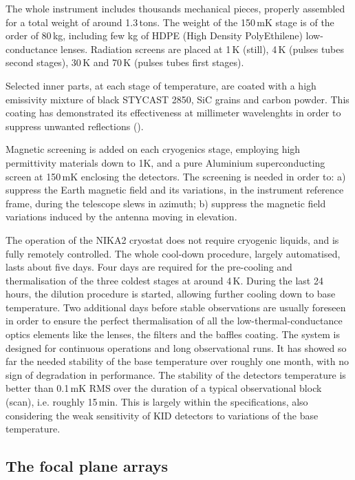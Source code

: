 \documentclass[]{aa} %
\begin{document}
The whole instrument includes thousands mechanical pieces, properly assembled for a total weight of around 1.3\,tons. The weight of the 150\,mK stage is of the order of 80\,kg, including few kg of HDPE (High Density PolyEthilene) low-conductance lenses. Radiation screens are placed at 1\,K (still), 4\,K (pulses tubes second stages), 30\,K and 70\,K (pulses tubes first stages).

Selected inner parts, at each stage of temperature, are coated with a high emissivity mixture of black STYCAST 2850, SiC grains and carbon powder. This coating has demonstrated its effectiveness at millimeter wavelenghts in order to suppress unwanted reflections (\cite{Calvo2010}).

Magnetic screening is added on each cryogenics stage, employing high permittivity materials down to 1K, and a pure Aluminium superconducting screen at 150\,mK enclosing the detectors. The screening is needed in order to: a) suppress the Earth magnetic field and its variations, in the instrument reference frame, during the telescope slews in azimuth; b) suppress the magnetic field variations induced by the antenna moving in elevation. 

The operation of the NIKA2 cryostat does not require cryogenic liquids, and is fully remotely controlled. The whole cool-down procedure, largely automatised, lasts about five days. Four days are required for the pre-cooling and thermalisation of the three coldest stages at around 4\,K. During the last 24 hours, the dilution procedure is started, allowing further cooling down to base temperature. Two additional days before stable observations are usually foreseen in order to ensure the perfect thermalisation of all the low-thermal-conductance optics elements like the lenses, the filters and the baffles coating. The system is designed for continuous operations and long observational runs. It has showed so far the needed stability of the base temperature over roughly one month, with no sign of degradation in performance. The stability of the detectors temperature is better than 0.1\,mK RMS over the duration of a typical observational block (scan), i.e. roughly 15\,min. This is largely within the specifications, also considering the weak sensitivity of KID detectors to variations of the base temperature. 


 \subsection{The focal plane arrays}
\end{document}

